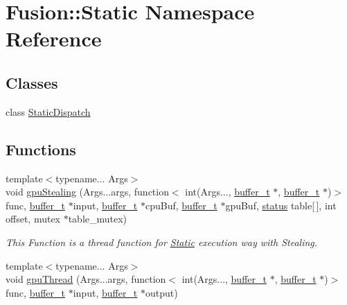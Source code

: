 \hypertarget{namespace_fusion_1_1_static}{\section{Fusion\-:\-:Static Namespace Reference}
\label{namespace_fusion_1_1_static}
}
\subsection*{Classes}
\begin{DoxyCompactItemize}
\item 
class \hyperlink{class_fusion_1_1_static_1_1_static_dispatch}{Static\-Dispatch}
\end{DoxyCompactItemize}
\subsection*{Functions}
\begin{DoxyCompactItemize}
\item 
{\footnotesize template$<$typename... Args$>$ }\\void \hyperlink{namespace_fusion_1_1_static_a4dda28311f1977091df5d7adb5aec742}{gpu\-Stealing} (Args...\-args, function$<$ int(Args..., \hyperlink{structbuffer__t}{buffer\-\_\-t} $\ast$, \hyperlink{structbuffer__t}{buffer\-\_\-t} $\ast$)$>$ func, \hyperlink{structbuffer__t}{buffer\-\_\-t} $\ast$input, \hyperlink{structbuffer__t}{buffer\-\_\-t} $\ast$cpu\-Buf, \hyperlink{structbuffer__t}{buffer\-\_\-t} $\ast$gpu\-Buf, \hyperlink{fusion__info_8h_a015eb90e0de9f16e87bd149d4b9ce959}{status} table\mbox{[}$\,$\mbox{]}, int offset, mutex $\ast$table\-\_\-mutex)
\begin{DoxyCompactList}\small\item\em This Function is a thread function for \hyperlink{namespace_fusion_1_1_static}{Static} execution way with Stealing. \end{DoxyCompactList}\item 
{\footnotesize template$<$typename... Args$>$ }\\void \hyperlink{namespace_fusion_1_1_static_a36302361627ccb126b6aeb0efa6d3ab2}{gpu\-Thread} (Args...\-args, function$<$ int(Args..., \hyperlink{structbuffer__t}{buffer\-\_\-t} $\ast$, \hyperlink{structbuffer__t}{buffer\-\_\-t} $\ast$)$>$ func, \hyperlink{structbuffer__t}{buffer\-\_\-t} $\ast$input, \hyperlink{structbuffer__t}{buffer\-\_\-t} $\ast$output)
\end{DoxyCompactItemize}


